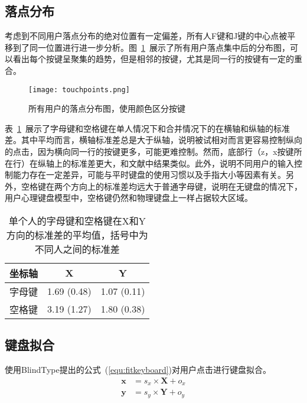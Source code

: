 \subsection{落点分布}
考虑到不同用户落点分布的绝对位置有一定偏差，所有人F键和J键的中心点被平移到了同一位置进行进一步分析\cite{flatglass2011findlater}\cite{palmboard2020}\cite{2018shitoast}。图~\ref{fig:points}~展示了所有用户落点集中后的分布图，可以看出每个按键呈聚集的趋势，但是相邻的按键，尤其是同一行的按键有一定的重合。

\begin{figure}[h] %
    \centering
    \texttt{[image: touchpoints.png]}
    \caption{所有用户的落点分布图，使用颜色区分按键}
    \label{fig:points}
\end{figure}

表~\ref{tab:sd}~展示了字母键和空格键在单人情况下和合并情况下的在横轴和纵轴的标准差。其中平均而言，横轴标准差总是大于纵轴，说明被试相对而言更容易控制纵向的点击，因为横向同一行的按键更多，可能更难控制。然而，底部行（z，x按键所在行）在纵轴上的标准差更大，和文献中结果类似\cite{flatglass2011findlater}。此外，说明不同用户的输入控制能力存在一定差异，可能与平时键盘的使用习惯以及手指大小等因素有关。另外，空格键在两个方向上的标准差均远大于普通字母键，说明在无键盘的情况下，用户心理键盘模型中，空格键仍然和物理键盘上一样占据较大区域。

\begin{table}[htb]
    \centering
    \begin{minipage}[t]{0.7\linewidth} %
    \caption[实验一按键标准差]{单个人的字母键和空格键在X和Y方向的标准差的平均值，括号中为不同人之间的标准差}
    \label{tab:sd}
      \centering
      \begin{tabularx}{0.6\linewidth}{c c c}
        \toprule[1.5pt]
        坐标轴 & X & Y\\\midrule[1pt]
        字母键 & 1.69 (0.48) & 1.07 (0.11)\\
        空格键 & 3.19 (1.27) & 1.80 (0.38)\\
        \bottomrule[1.5pt]
      \end{tabularx}
    \end{minipage}
  \end{table}

\subsection{键盘拟合}
使用BlindType\cite{2017blindtype}提出的公式~(\ref{equ:fitkeyboard})对用户点击进行键盘拟合。
\begin{equation}
  \label{equ:fitkeyboard}
  \begin{aligned}
  \textbf{x} &= s_{x} \times \textbf{X} + o_{x} \\
  \textbf{y} &= s_{y} \times \textbf{Y} + o_{y}
  \end{aligned}
\end{equation}

